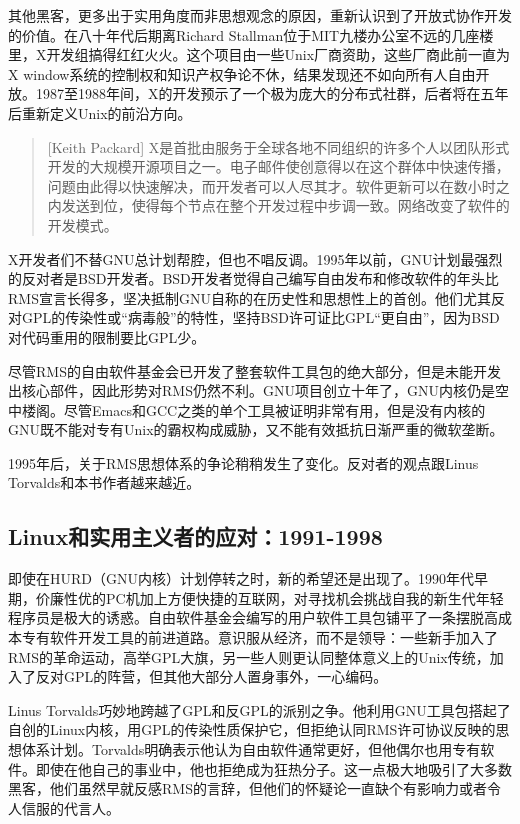 \documentclass[12pt,oneside]{ctexbook}
\begin{document}
\begin{common-format}
其他黑客，更多出于实用角度而非思想观念的原因，重新认识到了开放式协作开发的价值。在八十年代后期离Richard Stallman位于MIT九楼办公室不远的几座楼里，X开发组搞得红红火火。这个项目由一些Unix厂商资助，这些厂商此前一直为X window系统的控制权和知识产权争论不休，结果发现还不如向所有人自由开放。1987至1988年间，X的开发预示了一个极为庞大的分布式社群，后者将在五年后重新定义Unix的前沿方向。

\begin{quote}[Keith Packard]
X是首批由服务于全球各地不同组织的许多个人以团队形式开发的大规模开源项目之一。电子邮件使创意得以在这个群体中快速传播，问题由此得以快速解决，而开发者可以人尽其才。软件更新可以在数小时之内发送到位，使得每个节点在整个开发过程中步调一致。网络改变了软件的开发模式。
\end{quote}

X开发者们不替GNU总计划帮腔，但也不唱反调。1995年以前，GNU计划最强烈的反对者是BSD开发者。BSD开发者觉得自己编写自由发布和修改软件的年头比RMS宣言长得多，坚决抵制GNU自称的在历史性和思想性上的首创。他们尤其反对GPL的传染性或“病毒般”的特性，坚持BSD许可证比GPL“更自由”，因为BSD对代码重用的限制要比GPL少。

尽管RMS的自由软件基金会已开发了整套软件工具包的绝大部分，但是未能开发出核心部件，因此形势对RMS仍然不利。GNU项目创立十年了，GNU内核仍是空中楼阁。尽管Emacs和GCC之类的单个工具被证明非常有用，但是没有内核的GNU既不能对专有Unix的霸权构成威胁，又不能有效抵抗日渐严重的微软垄断。

1995年后，关于RMS思想体系的争论稍稍发生了变化。反对者的观点跟Linus Torvalds和本书作者越来越近。


\subsection{Linux和实用主义者的应对：1991-1998}
即使在HURD（GNU内核）计划停转之时，新的希望还是出现了。1990年代早期，价廉性优的PC机加上方便快捷的互联网，对寻找机会挑战自我的新生代年轻程序员是极大的诱惑。自由软件基金会编写的用户软件工具包铺平了一条摆脱高成本专有软件开发工具的前进道路。意识服从经济，而不是领导：一些新手加入了RMS的革命运动，高举GPL大旗，另一些人则更认同整体意义上的Unix传统，加入了反对GPL的阵营，但其他大部分人置身事外，一心编码。

Linus Torvalds巧妙地跨越了GPL和反GPL的派别之争。他利用GNU工具包搭起了自创的Linux内核，用GPL的传染性质保护它，但拒绝认同RMS许可协议反映的思
想体系计划。Torvalds明确表示他认为自由软件通常更好，但他偶尔也用专有软件。即使在他自己的事业中，他也拒绝成为狂热分子。这一点极大地吸引了大多数黑客，他们虽然早就反感RMS的言辞，但他们的怀疑论一直缺个有影响力或者令人信服的代言人。


\end{common-format}
\end{document}
